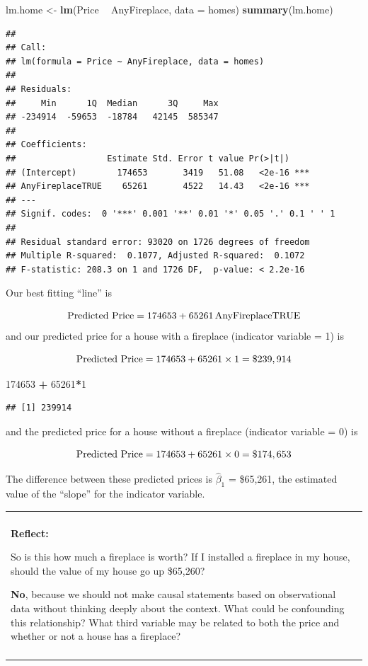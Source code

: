 \documentclass[
]{book}
\newenvironment{Shaded}{\begin{snugshade}}{\end{snugshade}}
\newcommand{\DataTypeTok}[1]{\textcolor[rgb]{0.13,0.29,0.53}{#1}}
\newcommand{\DecValTok}[1]{\textcolor[rgb]{0.00,0.00,0.81}{#1}}
\newcommand{\KeywordTok}[1]{\textcolor[rgb]{0.13,0.29,0.53}{\textbf{#1}}}
\newcommand{\NormalTok}[1]{#1}
\newcommand{\OperatorTok}[1]{\textcolor[rgb]{0.81,0.36,0.00}{\textbf{#1}}}
\newcommand{\StringTok}[1]{\textcolor[rgb]{0.31,0.60,0.02}{#1}}
\newenvironment{reflect}
{
    \begin{center}
    
    \begin{tabular}{|p{0.8\textwidth}|}
    \rowcolor{LightBlue}
    \hline\\
    \rowcolor{LightBlue}
    \textbf{Reflect:}
}
{
    \\\rowcolor{LightBlue}
    \\\hline
    \end{tabular} 
    \end{center}
}
\begin{document}
\begin{Shaded}
\begin{Highlighting}[]
\NormalTok{lm.home <-}\StringTok{ }\KeywordTok{lm}\NormalTok{(Price }\OperatorTok{~}\StringTok{ }\NormalTok{AnyFireplace, }\DataTypeTok{data =}\NormalTok{ homes)}
\KeywordTok{summary}\NormalTok{(lm.home)}
\end{Highlighting}
\end{Shaded}

\begin{verbatim}
## 
## Call:
## lm(formula = Price ~ AnyFireplace, data = homes)
## 
## Residuals:
##     Min      1Q  Median      3Q     Max 
## -234914  -59653  -18784   42145  585347 
## 
## Coefficients:
##                  Estimate Std. Error t value Pr(>|t|)    
## (Intercept)        174653       3419   51.08   <2e-16 ***
## AnyFireplaceTRUE    65261       4522   14.43   <2e-16 ***
## ---
## Signif. codes:  0 '***' 0.001 '**' 0.01 '*' 0.05 '.' 0.1 ' ' 1
## 
## Residual standard error: 93020 on 1726 degrees of freedom
## Multiple R-squared:  0.1077,	Adjusted R-squared:  0.1072 
## F-statistic: 208.3 on 1 and 1726 DF,  p-value: < 2.2e-16
\end{verbatim}

Our best fitting ``line'' is

\[ \hbox{Predicted Price} = 174653 + 65261\,\hbox{AnyFireplaceTRUE} \]
and our predicted price for a house with a fireplace (indicator variable = 1) is

\[ \hbox{Predicted Price} = 174653 + 65261 \times 1 = \$ 239,914 \]

\begin{Shaded}
\begin{Highlighting}[]
\DecValTok{174653} \OperatorTok{+}\StringTok{ }\DecValTok{65261}\OperatorTok{*}\DecValTok{1}
\end{Highlighting}
\end{Shaded}

\begin{verbatim}
## [1] 239914
\end{verbatim}

and the predicted price for a house without a fireplace (indicator variable = 0) is

\[\hbox{Predicted Price} = 174653 + 65261 \times 0 = \$ 174,653\]

The difference between these predicted prices is \(\hat{\beta}_1\) = \$65,261, the estimated value of the ``slope'' for the indicator variable.

\begin{reflect}
So is this how much a fireplace is worth? If I installed a fireplace in
my house, should the value of my house go up \$65,260?

\textbf{No}, because we should not make causal statements based on
observational data without thinking deeply about the context. What could
be confounding this relationship? What third variable may be related to
both the price and whether or not a house has a fireplace?
\end{reflect}
\end{document}
